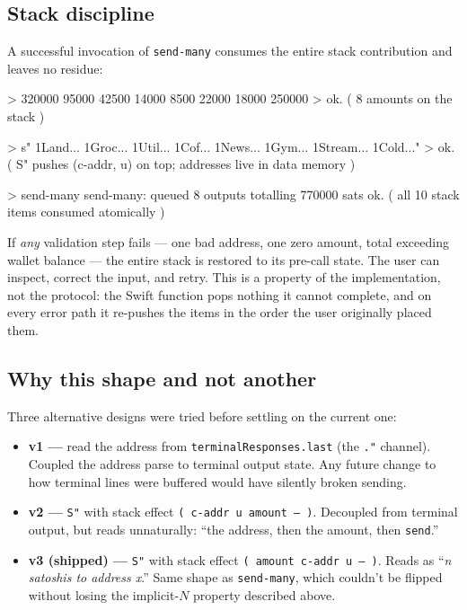 \documentclass[a4paper, 11pt]{article}
\begin{document}
\subsection{Stack discipline}

A successful invocation of \texttt{send-many} consumes the entire stack contribution and leaves no residue:

\begin{forthbox}
  > 320000 95000 42500 14000 8500 22000 18000 250000
  >  ok.   ( 8 amounts on the stack )

  > s" 1Land... 1Groc... 1Util... 1Cof... 1News... 1Gym... 1Stream... 1Cold..."
  >  ok.   ( S" pushes (c-addr, u) on top; addresses live in data memory )

  > send-many
  send-many: queued 8 outputs totalling 770000 sats
   ok.   ( all 10 stack items consumed atomically )
\end{forthbox}

If \emph{any} validation step fails --- one bad address, one zero amount, total exceeding wallet balance --- the entire stack is restored to its pre-call state. The user can inspect, correct the input, and retry. This is a property of the implementation, not the protocol: the Swift function pops nothing it cannot complete, and on every error path it re-pushes the items in the order the user originally placed them.

\subsection{Why this shape and not another}

Three alternative designs were tried before settling on the current one:

\begin{itemize}
\item \textbf{v1 ---} read the address from \texttt{terminalResponses.last} (the \texttt{."} channel). Coupled the address parse to terminal output state. Any future change to how terminal lines were buffered would have silently broken sending.
\item \textbf{v2 ---} \texttt{S"} with stack effect \texttt{( c-addr u amount -- )}. Decoupled from terminal output, but reads unnaturally: ``the address, then the amount, then \texttt{send}.''
\item \textbf{v3 (shipped) ---} \texttt{S"} with stack effect \texttt{( amount c-addr u -- )}. Reads as ``\emph{n satoshis to address x}.'' Same shape as \texttt{send-many}, which couldn't be flipped without losing the implicit-$N$ property described above.
\end{itemize}
\end{document}
